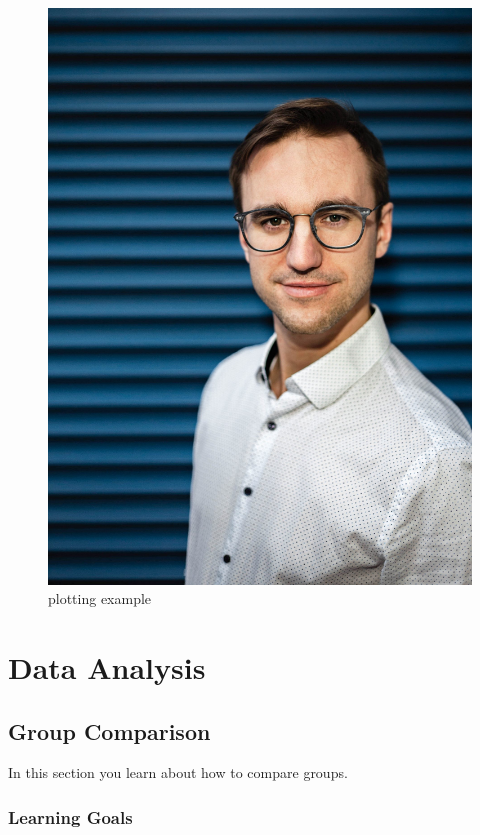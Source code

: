 \documentclass[
]{book}
\begin{document}
\begin{figure}

{\centering \includegraphics[width=0.6\linewidth]{images/Marco-scaled} 

}

\caption{\label{fig:figs}plotting example}\label{fig:unnamed-chunk-13}
\end{figure}

\hypertarget{part-data-analysis}{%
\part{Data Analysis}\label{part-data-analysis}}

\hypertarget{group-comparison}{%
\chapter{Group Comparison}\label{group-comparison}}

In this section you learn about how to compare groups.

\hypertarget{learning-goals}{%
\section{Learning Goals}\label{learning-goals}}
\end{document}
